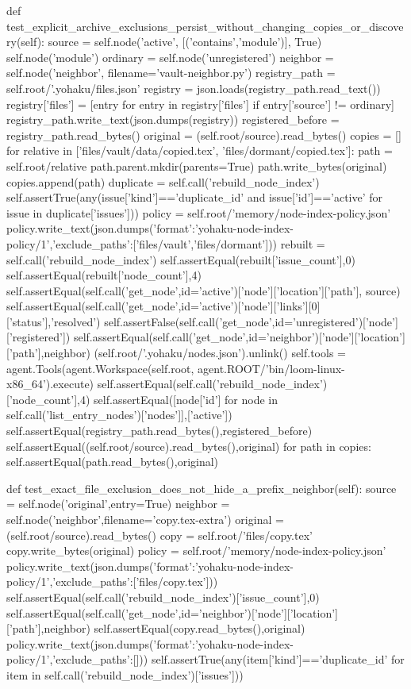    def test_explicit_archive_exclusions_persist_without_changing_copies_or_discovery(self):
        source = self.node('active', [('contains','module')], True)
        self.node('module')
        ordinary = self.node('unregistered')
        neighbor = self.node('neighbor', filename='vault-neighbor.py')
        registry_path = self.root/'.yohaku/files.json'
        registry = json.loads(registry_path.read_text())
        registry['files'] = [entry for entry in registry['files'] if entry['source'] != ordinary]
        registry_path.write_text(json.dumps(registry))
        registered_before = registry_path.read_bytes()
        original = (self.root/source).read_bytes()
        copies = []
        for relative in ['files/vault/data/copied.tex', 'files/dormant/copied.tex']:
            path = self.root/relative
            path.parent.mkdir(parents=True)
            path.write_bytes(original)
            copies.append(path)
        duplicate = self.call('rebuild_node_index')
        self.assertTrue(any(issue['kind']=='duplicate_id' and issue['id']=='active' for issue in duplicate['issues']))
        policy = self.root/'memory/node-index-policy.json'
        policy.write_text(json.dumps({'format':'yohaku-node-index-policy/1','exclude_paths':['files/vault','files/dormant']}))
        rebuilt = self.call('rebuild_node_index')
        self.assertEqual(rebuilt['issue_count'],0)
        self.assertEqual(rebuilt['node_count'],4)
        self.assertEqual(self.call('get_node',id='active')['node']['location']['path'], source)
        self.assertEqual(self.call('get_node',id='active')['node']['links'][0]['status'],'resolved')
        self.assertFalse(self.call('get_node',id='unregistered')['node']['registered'])
        self.assertEqual(self.call('get_node',id='neighbor')['node']['location']['path'],neighbor)
        (self.root/'.yohaku/nodes.json').unlink()
        self.tools = agent.Tools(agent.Workspace(self.root, agent.ROOT/'bin/loom-linux-x86_64').execute)
        self.assertEqual(self.call('rebuild_node_index')['node_count'],4)
        self.assertEqual([node['id'] for node in self.call('list_entry_nodes')['nodes']],['active'])
        self.assertEqual(registry_path.read_bytes(),registered_before)
        self.assertEqual((self.root/source).read_bytes(),original)
        for path in copies:
            self.assertEqual(path.read_bytes(),original)

    def test_exact_file_exclusion_does_not_hide_a_prefix_neighbor(self):
        source = self.node('original',entry=True)
        neighbor = self.node('neighbor',filename='copy.tex-extra')
        original = (self.root/source).read_bytes()
        copy = self.root/'files/copy.tex'
        copy.write_bytes(original)
        policy = self.root/'memory/node-index-policy.json'
        policy.write_text(json.dumps({'format':'yohaku-node-index-policy/1','exclude_paths':['files/copy.tex']}))
        self.assertEqual(self.call('rebuild_node_index')['issue_count'],0)
        self.assertEqual(self.call('get_node',id='neighbor')['node']['location']['path'],neighbor)
        self.assertEqual(copy.read_bytes(),original)
        policy.write_text(json.dumps({'format':'yohaku-node-index-policy/1','exclude_paths':[]}))
        self.assertTrue(any(item['kind']=='duplicate_id' for item in self.call('rebuild_node_index')['issues']))

